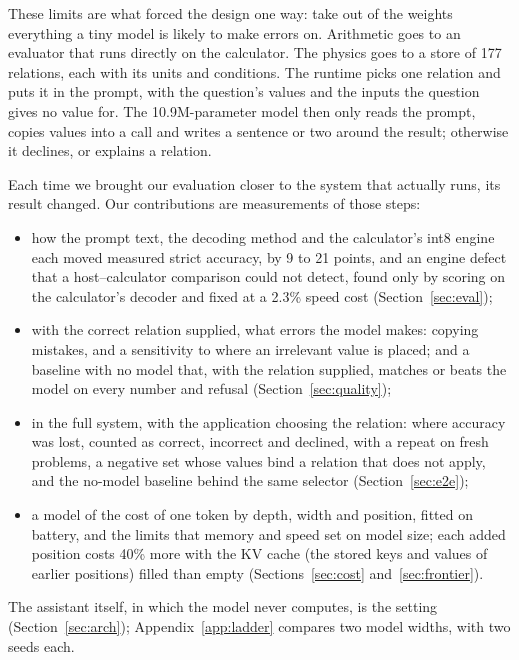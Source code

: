\documentclass[10pt]{article}
\begin{document}
These limits are what forced the design one way: take out of the weights everything a tiny model is likely
to make errors on. Arithmetic goes to an evaluator that runs directly on the calculator. The physics
goes to a store of 177 relations, each with its units and conditions. The runtime picks one relation and
puts it in the prompt, with the question's values and the inputs the question gives no value for. The 10.9M-parameter
model then only reads the prompt, copies values into a call and writes a sentence or two around the result;
otherwise it declines, or explains a relation.

Each time we brought our evaluation closer to the system that actually runs, its result changed. Our
contributions are measurements of those steps:
\begin{itemize}
\setlength{\itemsep}{1pt}
\item how the prompt text, the decoding method and the calculator's int8 engine each moved
  measured strict accuracy, by 9 to 21 points, and an engine defect that a host--calculator comparison could not
  detect, found only by scoring on the calculator's decoder and fixed at a 2.3\% speed cost
  (Section~\ref{sec:eval});
\item with the correct relation supplied, what errors the model makes: copying mistakes, and a
  sensitivity to where an irrelevant value is placed; and a baseline with no model that, with the
  relation supplied, matches or beats the model on every number and refusal (Section~\ref{sec:quality});
\item in the full system, with the application choosing the relation: where accuracy was lost,
  counted as correct, incorrect and declined, with a repeat on fresh problems, a negative set whose values bind a relation that does
  not apply, and the no-model baseline behind the same selector (Section~\ref{sec:e2e});
\item a model of the cost of one token by depth, width and position, fitted on battery, and the
  limits that memory and speed set on model size; each added position costs 40\% more with the KV cache (the stored keys and values of earlier
  positions) filled than empty (Sections~\ref{sec:cost}
  and~\ref{sec:frontier}).
\end{itemize}
The assistant itself, in which the model never computes, is the setting (Section~\ref{sec:arch});
Appendix~\ref{app:ladder} compares two model widths, with two seeds each.

\end{document}
